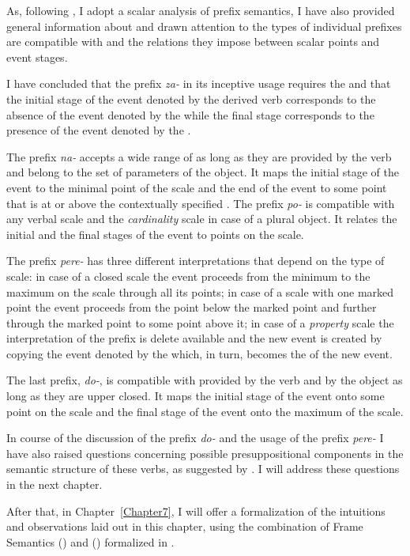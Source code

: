 As, following \citet{Kagan:book}, I adopt a scalar analysis of prefix semantics, I have also provided general information about  and drawn attention to the types of  individual prefixes are compatible with and the relations they impose between scalar points and event stages. 

I have concluded that the prefix \textit{za-} in its inceptive usage requires the  and that the initial stage of the event denoted by the derived verb corresponds to the absence of the event denoted by the  while the final stage corresponds to the presence of the event denoted by the . 

The prefix \textit{na-} accepts a wide range of  as long as they are provided by the verb and belong to the set of parameters of the object. It maps the initial stage of the event to the minimal point of the scale and the end of the event to some point that is at or above the contextually specified . The prefix \textit{po-} is compatible with any verbal scale and the \textit{cardinality} scale in case of a plural object. It relates the initial and the final stages of the event to points on the scale. 

The prefix \textit{pere-} has three different interpretations that depend on the type of scale: in case of a closed scale the event proceeds from the minimum to the maximum on the scale through all its points; in case of a scale with one marked point the event proceeds from the point below the marked point and further through the marked point to some point above it; in case of a \textit{property} scale the  interpretation of the prefix is delete available and the new event is created by copying the event denoted by the  which, in turn, becomes the  of the new event. 

The last prefix, \textit{do-}, is compatible with  provided by the verb and by the object as long as they are upper closed. It maps the initial stage of the event onto some point on the scale and the final stage of the event onto the maximum of the scale. 

In course of the discussion of the prefix \textit{do-} and the  usage of the prefix \textit{pere-} I have also raised questions concerning possible presuppositional components in the semantic structure of these verbs, as suggested by \citet{Kagan:book}. I will address these questions in the next chapter.

After that, in Chapter~\ref{Chapter7}, I will offer a formalization of the intuitions and observations laid out in this chapter, using the combination of Frame Semantics (\citealt{Fillmore:82}) and  (\citealt{JoshiSchabes:97}) formalized in \citealt{KallmeyerOsswald:13}. 

